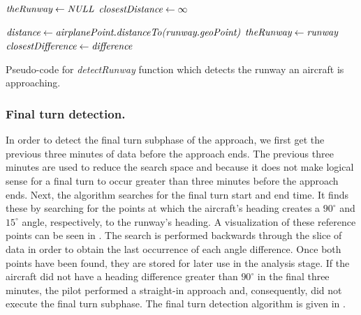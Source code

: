             \begin{algorithm}
                \begin{algorithmic}[1]\raggedright
                        \State $ \textit{theRunway} \gets \textit{NULL} $
                        \State $ \textit{closestDistance} \gets \infty $

                                \State $ \textit{distance} \gets \textit{airplanePoint.distanceTo(runway.geoPoint)} $
                                    \State $ \textit{theRunway} \gets \textit{runway} $
                                    \State $ \textit{closestDifference} \gets \textit{difference} $
                                \EndIf
                            \EndIf
                        \EndFor

                        \State {}
                    \EndFunction
                \end{algorithmic}
                \caption{Pseudo-code for \textit{detectRunway} function which detects the runway an aircraft is approaching.}
                \label{alg:detect_runway}
            \end{algorithm}
        
        
        \subsubsection{Final turn detection.}
        
        	In order to detect the final turn subphase of the approach, we first get the previous three minutes of data before the approach ends.  The previous three minutes are used to reduce the search space and because it does not make logical sense for a final turn to occur greater than three minutes before the approach ends.  Next, the algorithm searches for the final turn start and end time.  It finds these by searching for the points at which the aircraft's heading creates a $90^\circ$ and $15^\circ$ angle, respectively, to the runway's heading.  A visualization of these reference points can be seen in .  The search is performed backwards through the slice of data in order to obtain the last occurrence of each angle difference.  Once both points have been found, they are stored for later use in the analysis stage.  If the aircraft did not have a heading difference greater than $90^\circ$ in the final three minutes, the pilot performed a straight-in approach and, consequently, did not execute the final turn subphase.
        	The final turn detection algorithm is given in .
            
